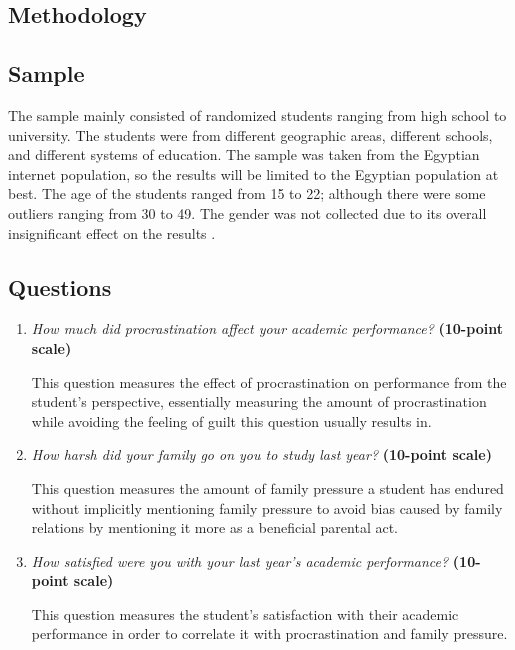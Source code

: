 \documentclass[12pt]{report}
\begin{document}
\begin{multicols}{2}
    
\section{Methodology}

\subsection{Sample}

The sample mainly consisted of randomized students ranging from high school to
university. The students were from different geographic areas, different
schools, and different systems of education. The sample was taken from the
Egyptian internet population, so the results will be limited to the Egyptian
population at best. The age of the students ranged from 15 to 22; although there
were some outliers ranging from 30 to 49. The gender was not collected due to
its overall insignificant effect on the results \parencite{hashmat2008factors}.

\subsection{Questions}

\begin{enumerate}[wide, labelwidth=!, labelindent=0pt]

    \item \textit{How much did procrastination affect your academic performance?}
\textbf{(10-point scale)}

This question measures the effect of procrastination on performance from the
student's perspective, essentially measuring the amount of procrastination while
avoiding the feeling of guilt this question usually results in.

\item \textit{How harsh did your family go on you to study last year?}
\textbf{(10-point scale)}

This question measures the amount of family pressure a student has endured
without implicitly mentioning family pressure to avoid bias caused by family
relations by mentioning it more as a beneficial parental act.

\item \textit{How satisfied were you with your last year's academic
performance?}
\textbf{(10-point scale)}

This question measures the student's satisfaction with their academic
performance in order to correlate it with procrastination and family pressure.


\end{enumerate}
\end{multicols}
\end{document}
